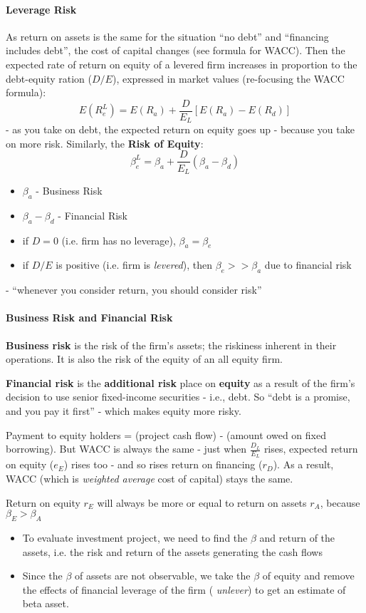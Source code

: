 \documentclass{scrartcl}
\begin{document}
\paragraph{Leverage Risk}
As return on assets is the same for the situation ``no debt'' and ``financing
includes debt'', the cost of capital changes (see formula for WACC). Then the
expected rate of return on equity of a levered firm increases in proportion to
the debt-equity ration ($D/E$), expressed in market values (re-focusing the WACC
formula):
$$E(R^L_e) = E(R_a) + \frac{D}{E_L} [ E(R_a) - E(R_d)]$$
- as you take on debt, the expected return on equity goes up - because you take
on more risk. Similarly, the {\bf Risk of Equity}:
$$\beta_e^L = \beta_a + \frac{D}{E_L}(\beta_a - \beta_d)$$
\begin{itemize}
\item $\beta_a$ - Business Risk
\item $\beta_a - \beta_d$ - Financial Risk
\item if $D=0$ (i.e. firm has no leverage), $\beta_a = \beta_e$
\item if $D/E$ is positive (i.e. firm is {\it levered}), then $\beta_e >>
  \beta_a$ due to financial risk
\end{itemize}
- ``whenever you consider return, you should consider risk''

\paragraph{Business Risk and Financial Risk}

{\bf Business risk} is the risk of the firm's assets; the riskiness inherent in
their operations. It is also the risk of the equity of an all equity firm.

{\bf Financial risk} is the {\bf additional risk} place on {\bf equity} as a
result of the firm's decision to use senior fixed-income securities - i.e.,
debt. So ``debt is a promise, and you pay it first'' - which makes equity more
risky. 

Payment to equity holders = (project cash flow) - (amount owed on fixed
borrowing). But WACC is always the same - just when $\frac{D_L}{E_L}$ rises,
expected return on equity ($e_E$) rises too - and so rises return on financing
($r_D$). As a result, WACC (which is {\it weighted average} cost of capital)
stays the same.  

Return on equity $r_E$ will always be more or equal to return on assets $r_A$,
because $\beta_E > \beta_A$ 
\begin{itemize}
\item To evaluate investment project, we need to find the $\beta$ and return of
  the assets, i.e. the risk and return of the assets generating the cash flows
\item Since the $\beta$ of assets are not observable, we take the $\beta$ of
  equity and remove the effects of financial leverage of the firm ({\it
    unlever}) to get an estimate of beta asset.
\end{itemize}
\end{document}
